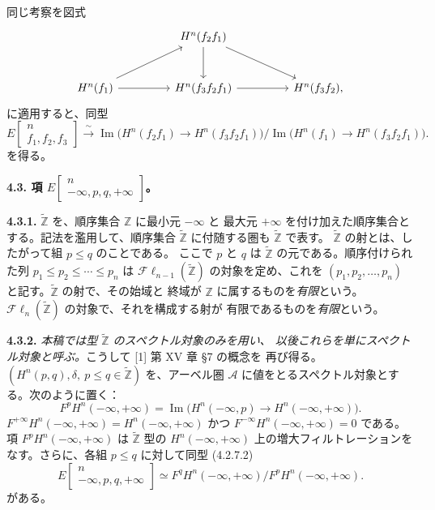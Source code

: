 \clearpage
{}%
\begingroup\small\setlength{\parskip}{0pt}\setlength{\emergencystretch}{2.5em}
同じ考察を図式
\[
\begin{tikzcd}[column sep=4.6em,row sep=2.8em]
&H^n(f_2f_1)\arrow[d]\arrow[dr]&\\
H^n(f_1)\arrow[ur]\arrow[r]&
H^n(f_3f_2f_1)\arrow[r]&H^n(f_3f_2),
\end{tikzcd}
\]
に適用すると、同型
\[
E\!\begin{bmatrix}n\\ f_1,f_2,f_3\end{bmatrix}
\xrightarrow{\ \sim\ }
\operatorname{Im}\bigl(H^n(f_2f_1)\longrightarrow H^n(f_3f_2f_1)\bigr)
\Big/
\operatorname{Im}\bigl(H^n(f_1)\longrightarrow H^n(f_3f_2f_1)\bigr).
\tag{4.2.7.2}
\]
を得る。

\medskip\noindent\textbf{4.3. 項
$E\!\begin{bmatrix}n\\ -\infty,p,q,+\infty\end{bmatrix}$。}

\medskip\noindent\textbf{4.3.1.}
$\widetilde{\mathbb Z}$ を、順序集合 $\mathbb Z$ に最小元 $-\infty$ と
最大元 $+\infty$ を付け加えた順序集合とする。記法を濫用して、順序集合
$\widetilde{\mathbb Z}$ に付随する圏も $\widetilde{\mathbb Z}$ で表す。
$\widetilde{\mathbb Z}$ の射とは、したがって組 $p\leq q$ のことである。
ここで $p$ と $q$ は $\widetilde{\mathbb Z}$ の元である。順序付けられた列
$p_1\leq p_2\leq\cdots\leq p_n$ は
$\mathcal{F}\ell_{n-1}(\widetilde{\mathbb Z})$ の対象を定め、これを
$(p_1,p_2,\ldots,p_n)$ と記す。$\widetilde{\mathbb Z}$ の射で、その始域と
終域が $\mathbb Z$ に属するものを\textit{有限}という。
$\mathcal{F}\ell_n(\widetilde{\mathbb Z})$ の対象で、それを構成する射が
有限であるものを\textit{有限}という。

\medskip\noindent\textbf{4.3.2.}
\textit{本稿では型 $\widetilde{\mathbb Z}$ のスペクトル対象のみを用い、
以後これらを単にスペクトル対象と呼ぶ。}こうして [1] 第 XV 章 §7 の概念を
再び得る。
$(H^n(p,q),\delta,\ p\leq q\in\widetilde{\mathbb Z})$ を、アーベル圏
$\mathcal A$ に値をとるスペクトル対象とする。次のように置く：
\[
F^pH^n(-\infty,+\infty)
=\operatorname{Im}\bigl(H^n(-\infty,p)\longrightarrow
H^n(-\infty,+\infty)\bigr).
\tag{4.3.2.1}
\]
$F^{+\infty}H^n(-\infty,+\infty)=H^n(-\infty,+\infty)$ かつ
$F^{-\infty}H^n(-\infty,+\infty)=0$ である。項
$F^pH^n(-\infty,+\infty)$ は $\widetilde{\mathbb Z}$ 型の
$H^n(-\infty,+\infty)$ 上の増大フィルトレーションをなす。さらに、各組
$p\leq q$ に対して同型 (4.2.7.2)
\[
E\!\begin{bmatrix}n\\ -\infty,p,q,+\infty\end{bmatrix}
\simeq
F^qH^n(-\infty,+\infty)\big/F^pH^n(-\infty,+\infty).
\]
がある。
\endgroup
